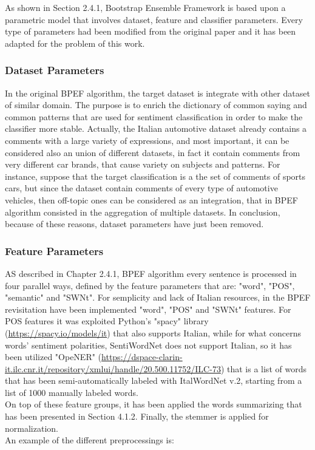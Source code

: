 As shown in Section 2.4.1, Bootstrap Ensemble Framework is based upon a parametric model that involves dataset, feature and classifier parameters. Every type of parameters had been modified from the original paper and it has been adapted for the problem of this work.

\subsubsection{Dataset Parameters}

In the original BPEF algorithm, the target dataset is integrate with other dataset of similar domain. The purpose is to enrich the dictionary of common saying and common patterns that are used for sentiment classification in order to make the classifier more stable. Actually, the Italian automotive dataset already contains a comments with a large variety of expressions, and most important, it can be considered also an union of different datasets, in fact it contain comments from very different car brands, that cause variety on subjects and patterns. For instance, suppose that the target classification is a the set of comments of sports cars, but since the dataset contain comments of every type of automotive vehicles, then off-topic ones can be considered as an integration, that in BPEF algorithm consisted in the aggregation of multiple datasets. In conclusion, because of these reasons, dataset parameters have just been removed.


\subsubsection{Feature Parameters}

AS described in Chapter 2.4.1, BPEF algorithm every sentence is processed in four parallel ways, defined by the feature parameters that are: "word", "POS", "semantic" and "SWNt". For semplicity and lack of Italian resources, in the BPEF revisitation have been implemented "word", "POS" and "SWNt" features. For POS features it was exploited Python's "spacy" library (\url{https://spacy.io/models/it}) that also supports Italian, while for what  concerns words' sentiment polarities, SentiWordNet does not support Italian, so it has been utilized "OpeNER" (\url{https://dspace-clarin-it.ilc.cnr.it/repository/xmlui/handle/20.500.11752/ILC-73}) that is a list of words that has been semi-automatically labeled with ItalWordNet v.2, starting from a list of 1000 manually labeled words.\\
On top of these feature groups, it has been applied the words summarizing that has been presented in Section 4.1.2. Finally, the stemmer is applied for normalization.\\
An example of the different preprocessings is:

